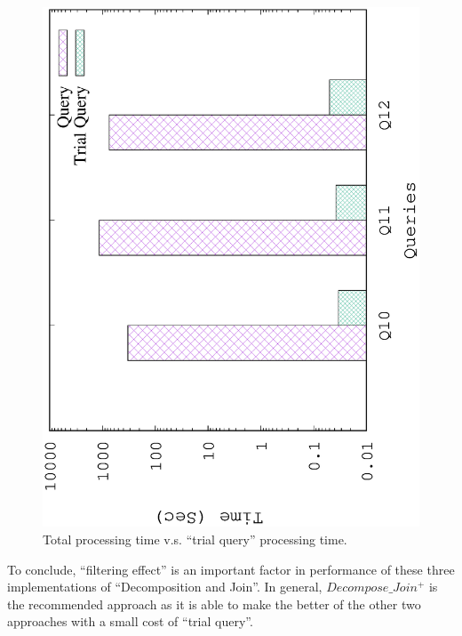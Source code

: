 \begin{figure}[H]
\centering
\includegraphics[scale=0.5, angle=270]{plot/threesample}
\caption{Total processing time v.s. ``trial query'' processing time.}
\label{fig:threesample}
\end{figure}

To conclude, ``filtering effect'' is an important factor in performance of these three implementations of ``Decomposition and Join''. In general, $Decompose\_Join^{+}$ is the recommended approach as it is able to make the better of the other two approaches with a small cost of ``trial query''.


%

